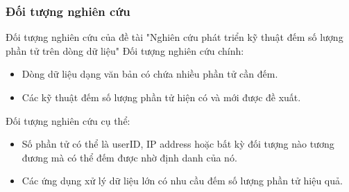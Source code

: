 \documentclass[letterpaper,13pt]{article}
\theoremstyle{mytheor}
\begin{document}
\subsubsection{Đối tượng nghiên cứu }
Đối tượng nghiên cứu của đề tài "Nghiên cứu phát triển kỹ thuật đếm số lượng phần tử trên dòng dữ liệu"
Đối tượng nghiên cứu chính:
\begin{itemize}
    \item Dòng dữ liệu dạng văn bản có chứa nhiều phần tử cần đếm.
    \item Các kỹ thuật đếm số lượng phần tử hiện có và mới được đề xuất.
\end{itemize}
Đối tượng nghiên cứu cụ thể:
\begin{itemize}
    \item Số phần tử có thể là userID, IP address hoặc bất kỳ đối tượng nào tương đương mà có thể đếm được nhờ định danh của nó.
    \item Các ứng dụng xử lý dữ liệu lớn có nhu cầu đếm số lượng phần tử hiệu quả.
\end{itemize}
\end{document}
